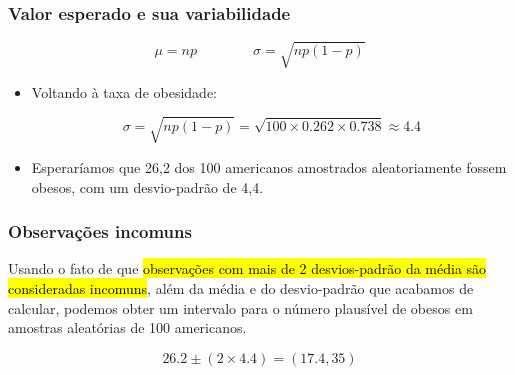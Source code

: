 
\begin{frame}
\frametitle{Valor esperado e sua variabilidade}

{\[ \mu = np \qquad \qquad \sigma = \sqrt{np(1-p)} \] }

\pause

\begin{itemize}

\item Voltando à taxa de obesidade:

\[ \sigma = \sqrt{np(1-p)} = \sqrt{100 \times 0.262 \times 0.738} \approx  4.4\]

\pause
\justifying
\item Esperaríamos que 26,2 dos 100 americanos amostrados aleatoriamente fossem obesos, com um desvio-padrão de 4,4.

\end{itemize}
\justifying
{}

\end{frame}


\begin{frame}
\frametitle{Observações incomuns}
\justifying
Usando o fato de que \hl{observações com mais de 2 desvios-padrão da média são consideradas incomuns}, além da média e do desvio-padrão que acabamos de calcular, podemos obter um intervalo para o número plausível de obesos em amostras aleatórias de 100 americanos.

\[ 26.2 \pm (2 \times 4.4) = (17.4, 35) \]

\end{frame}


